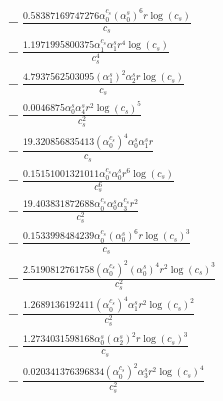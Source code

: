 \documentclass[10pt]{article}
\begin{document}
\begin{align*}
&{}  - \frac{0.58387169747276 \alpha_{0}^{c_s} \left(\alpha_{0}^s\right)^{6} r \log{\left(c_{s} \right)}}{c_{s}} \\
&{}  - \frac{1.1971995800375 \alpha_{1}^{c_s} \alpha_{1}^s r^{4} \log{\left(c_{s} \right)}}{c_{s}^{4}} \\
&{}  - \frac{4.7937562503095 \left(\alpha_{1}^s\right)^{2} \alpha_{2}^s r \log{\left(c_{s} \right)}}{c_{s}} \\
&{}  - \frac{0.0046875 \alpha_{0}^s \alpha_{4}^s r^{2} \log{\left(c_{s} \right)}^{5}}{c_{s}^{2}} \\
&{}  - \frac{19.320856835413 \left(\alpha_{0}^{c_s}\right)^{4} \alpha_{0}^s \alpha_{1}^s r}{c_{s}} \\
&{}  - \frac{0.15151001321011 \alpha_{0}^{c_s} \alpha_{0}^s r^{6} \log{\left(c_{s} \right)}}{c_{s}^{6}} \\
&{}  - \frac{19.403831872688 \alpha_{0}^{c_s} \alpha_{0}^s \alpha_{3}^{c_s} r^{2}}{c_{s}^{2}} \\
&{}  - \frac{0.1533998484239 \alpha_{0}^{c_s} \left(\alpha_{0}^s\right)^{6} r \log{\left(c_{s} \right)}^{3}}{c_{s}} \\
&{}  - \frac{2.5190812761758 \left(\alpha_{0}^{c_s}\right)^{2} \left(\alpha_{0}^s\right)^{4} r^{2} \log{\left(c_{s} \right)}^{3}}{c_{s}^{2}} \\
&{}  - \frac{1.2689136192411 \left(\alpha_{0}^{c_s}\right)^{4} \alpha_{1}^s r^{2} \log{\left(c_{s} \right)}^{2}}{c_{s}^{2}} \\
&{}  - \frac{1.2734031598168 \alpha_{0}^s \left(\alpha_{2}^s\right)^{2} r \log{\left(c_{s} \right)}^{3}}{c_{s}} \\
&{}  - \frac{0.020341376396834 \left(\alpha_{0}^{c_s}\right)^{2} \alpha_{3}^s r^{2} \log{\left(c_{s} \right)}^{4}}{c_{s}^{2}}
\end{align*}
\end{document}
